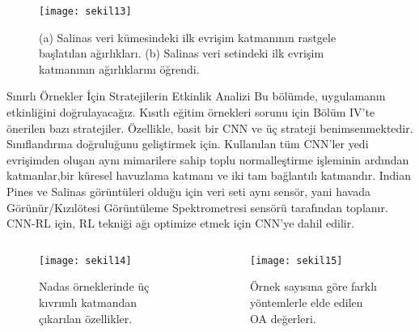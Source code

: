 \documentclass{beamer}
\begin{document}
\begin{frame}
\begin{figure}[]
  \centering
  \texttt{[image: sekil13]} %
  \caption{(a) Salinas veri kümesindeki ilk evrişim katmanının rastgele başlatılan ağırlıkları. (b) Salinas veri setindeki ilk evrişim katmanının ağırlıklarını öğrendi.}
  \label{fig:sekil11}
\end{figure}
\end{frame}

\begin{frame}{Sınırlı Örnekler İçin Stratejilerin Etkinlik Analizi}
  Bu bölümde, uygulamanın etkinliğini doğrulayacağız. Kısıtlı eğitim örnekleri sorunu için Bölüm IV'te önerilen bazı stratejiler. Özellikle, basit bir CNN ve üç strateji benimsenmektedir. Sınıflandırma doğruluğunu geliştirmek için. Kullanılan tüm CNN’ler yedi evrişimden oluşan aynı mimarilere sahip toplu normalleştirme işleminin ardından katmanlar,bir küresel havuzlama katmanı ve iki tam bağlantılı katmandır. Indian Pines ve Salinas görüntüleri olduğu için veri seti aynı sensör, yani havada Görünür/Kızılötesi Görüntüleme Spektrometresi sensörü tarafından toplanır. CNN-RL için, RL tekniği ağı optimize etmek için CNN'ye dahil edilir.
\end{frame}

\begin{frame}

  \begin{columns}
    \begin{column}{0.4\textwidth}
      \begin{figure}[htbp]
        \texttt{[image: sekil14]}
        \caption{Nadas örneklerinde üç kıvrımlı katmandan çıkarılan özellikler.}
        \label{fig:sekil9}
      \end{figure}
    \end{column}

    \begin{column}{0.7\textwidth}
      \begin{figure}[htbp]
        \texttt{[image: sekil15]}
        \caption{Örnek sayısına göre farklı yöntemlerle elde edilen OA değerleri.}
        \label{fig:sekil10}
      \end{figure}
    \end{column}
  \end{columns}
\end{frame}
\end{document}
